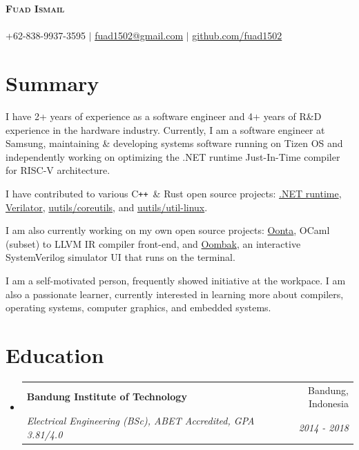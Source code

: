 \documentclass[letterpaper,11pt]{article}
\makeatletter
\newcommand{\resumeSubheading}[4]{
  \vspace{-2pt}\item
    \begin{tabular*}{0.97\textwidth}[t]{l@{\extracolsep{\fill}}r}
      \textbf{#1} & #2 \\
      \textit{\small#3} & \textit{\small #4} \\
    \end{tabular*}\vspace{-7pt}
}
\newcommand{\resumeSubHeadingListStart}{\begin{itemize}[leftmargin=0.15in, label={}]}
\newcommand{\resumeSubHeadingListEnd}{\end{itemize}}
\newcommand{\githubPRs}[2]{\href{https://github.com/#1/pulls?q=is\%3Apr+author\%3Afuad1502}{#2}}
\newcommand\CC{C\texttt{++}}
\makeatother
\begin{document}
\begin{center}
	\textbf{\Huge \scshape Fuad Ismail} \\
	\vspace{1pt} \small \textit{} \\
	+62-838-9937-3595 $|$ \href{mailto:fuad1502@gmail.com}{fuad1502@gmail.com} $|$ \href{https://github.com/fuad1502}{github.com/fuad1502}
\end{center}

\section*{Summary}
\justifying

I have 2+ years of experience as a software engineer and 4+ years of R\&D
experience in the hardware industry. Currently, I am a software engineer at
Samsung, maintaining \& developing systems software running on Tizen OS and
independently working on optimizing the .NET runtime Just-In-Time compiler for
RISC-V architecture.

I have contributed to various \CC\ \& Rust open source projects:
\githubPRs{dotnet/runtime}{.NET runtime},
\githubPRs{verilator/verilator}{Verilator},
\githubPRs{uutils/coreutils}{uutils/coreutils}, and
\githubPRs{uutils/util-linux}{uutils/util-linux}.

I am also currently working on my own open source projects:
\href{https://github.com/fuad1502/oonta}{Oonta}, OCaml (subset) to LLVM IR
compiler front-end, and \href{https://github.com/fuad1502/oombak}{Oombak}, an
interactive SystemVerilog simulator UI that runs on the terminal.

I am a self-motivated person, frequently showed initiative at the workpace. I
am also a passionate learner, currently interested in learning more about
compilers, operating systems, computer graphics, and embedded systems.

\section{Education}
\resumeSubHeadingListStart
\resumeSubheading
{Bandung Institute of Technology}{Bandung, Indonesia}
{Electrical Engineering (BSc), ABET Accredited, GPA 3.81/4.0}{2014 - 2018}
\resumeSubHeadingListEnd

\end{document}
